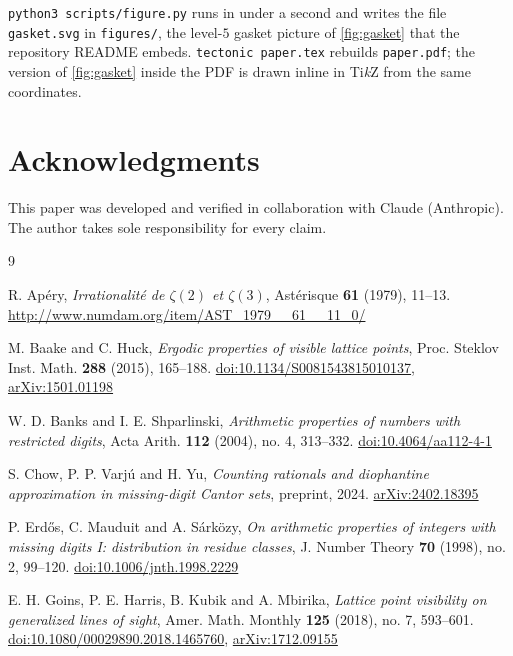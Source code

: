 \documentclass[11pt]{amsart}
\theoremstyle{definition}
\theoremstyle{remark}
\begin{document}
\texttt{python3 scripts/figure.py} runs in under a second and writes the file \texttt{gasket.svg} in \texttt{figures/}, the level-$5$ gasket picture of \cref{fig:gasket} that the repository README embeds. \texttt{tectonic paper.tex} rebuilds \texttt{paper.pdf}; the version of \cref{fig:gasket} inside the PDF is drawn inline in Ti\emph{k}Z from the same coordinates.

\section*{Acknowledgments}

This paper was developed and verified in collaboration with Claude (Anthropic). The author takes sole responsibility for every claim.

\begin{thebibliography}{9}

R. Ap\'ery, \emph{Irrationalit\'e de $\zeta(2)$ et $\zeta(3)$}, Ast\'erisque \textbf{61} (1979), 11--13. \url{http://www.numdam.org/item/AST_1979__61__11_0/}

M. Baake and C. Huck, \emph{Ergodic properties of visible lattice points}, Proc. Steklov Inst. Math. \textbf{288} (2015), 165--188. \href{https://doi.org/10.1134/S0081543815010137}{doi:10.1134/S0081543815010137}, \href{https://arxiv.org/abs/1501.01198}{arXiv:1501.01198}

W. D. Banks and I. E. Shparlinski, \emph{Arithmetic properties of numbers with restricted digits}, Acta Arith. \textbf{112} (2004), no. 4, 313--332. \href{https://doi.org/10.4064/aa112-4-1}{doi:10.4064/aa112-4-1}

S. Chow, P. P. Varj\'u and H. Yu, \emph{Counting rationals and diophantine approximation in missing-digit Cantor sets}, preprint, 2024. \href{https://arxiv.org/abs/2402.18395}{arXiv:2402.18395}

P. Erd\H{o}s, C. Mauduit and A. S\'ark\"ozy, \emph{On arithmetic properties of integers with missing digits I: distribution in residue classes}, J. Number Theory \textbf{70} (1998), no. 2, 99--120. \href{https://doi.org/10.1006/jnth.1998.2229}{doi:10.1006/jnth.1998.2229}

E. H. Goins, P. E. Harris, B. Kubik and A. Mbirika, \emph{Lattice point visibility on generalized lines of sight}, Amer. Math. Monthly \textbf{125} (2018), no. 7, 593--601. \href{https://doi.org/10.1080/00029890.2018.1465760}{doi:10.1080/00029890.2018.1465760}, \href{https://arxiv.org/abs/1712.09155}{arXiv:1712.09155}


\end{thebibliography}
\end{document}
